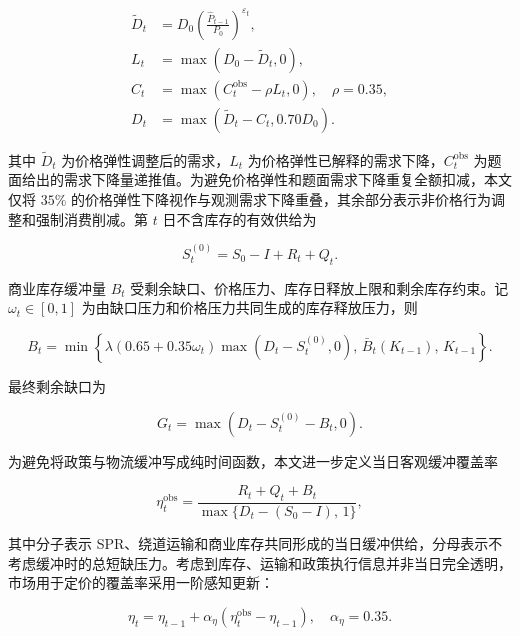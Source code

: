 \begin{equation}
  \begin{aligned}
  \tilde D_t &= D_0\left(\frac{\hat P_{t-1}}{P_0}\right)^{\varepsilon_t},\\
  L_t &= \max(D_0-\tilde D_t,0),\\
  C_t &= \max(C_t^{\mathrm{obs}}-\rho L_t,0),\quad \rho=0.35,\\
  D_t &= \max(\tilde D_t-C_t,0.70D_0).
  \end{aligned}
\end{equation}

其中 \(\tilde D_t\) 为价格弹性调整后的需求，\(L_t\) 为价格弹性已解释的需求下降，\(C_t^{\mathrm{obs}}\) 为题面给出的需求下降量递推值。为避免价格弹性和题面需求下降重复全额扣减，本文仅将 \(35\%\) 的价格弹性下降视作与观测需求下降重叠，其余部分表示非价格行为调整和强制消费削减。第 $t$ 日不含库存的有效供给为

\begin{equation}
  S_t^{(0)}
  =
  S_0 - I + R_t + Q_t.
\end{equation}

商业库存缓冲量 $B_t$ 受剩余缺口、价格压力、库存日释放上限和剩余库存约束。记
\(\omega_t\in[0,1]\) 为由缺口压力和价格压力共同生成的库存释放压力，则

\begin{equation}
  B_t
  =
  \min\left\{
    \lambda(0.65+0.35\omega_t)\max(D_t-S_t^{(0)},0),\,
    \bar B_t(K_{t-1}),\,
    K_{t-1}
  \right\}.
\end{equation}

最终剩余缺口为

\begin{equation}
  G_t = \max(D_t-S_t^{(0)}-B_t,0).
\end{equation}

为避免将政策与物流缓冲写成纯时间函数，本文进一步定义当日客观缓冲覆盖率

\begin{equation}
  \eta_t^{\mathrm{obs}}
  =
  \frac{R_t+Q_t+B_t}
  {\max\{D_t-(S_0-I),\,1\}},
\end{equation}

其中分子表示 SPR、绕道运输和商业库存共同形成的当日缓冲供给，分母表示不考虑缓冲时的总短缺压力。考虑到库存、运输和政策执行信息并非当日完全透明，市场用于定价的覆盖率采用一阶感知更新：

\begin{equation}
  \eta_t
  =
  \eta_{t-1}
  +
  \alpha_\eta\left(\eta_t^{\mathrm{obs}}-\eta_{t-1}\right),
  \quad \alpha_\eta=0.35 .
\end{equation}

